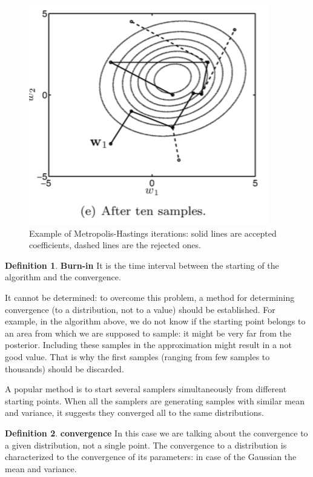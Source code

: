 \documentclass[12pt, letterpaper]{article}
\theoremstyle{definition}
\newtheorem{definition}{Definition}[section]
\begin{document}
\begin{figure}
\centering
\includegraphics[scale=0.4]{img/randomWalk}
\caption{Example of Metropolis-Hastings iterations: solid lines are accepted coefficients, dashed lines are the rejected ones.}
\label{randomWalk}
\end{figure}

\begin{definition}{\textbf{Burn-in}} It is the time interval between the starting of the algorithm and the convergence. 
\end{definition}
It cannot be determined: to overcome this problem, a method for determining convergence (to a distribution, not to a value) should be established. For example, in the algorithm above, we do not know if the starting point belongs to an area from which we are supposed to sample: it might be very far from the posterior. Including these samples in the approximation might result in a not good value. That is why the first samples (ranging from few samples to thousands) should be discarded.

A popular method is to start several samplers simultaneously from different starting points. When all the samplers are generating samples with similar mean and variance, it suggests they converged all to the same distributions.

\begin{definition}{\textbf{convergence} In this case we are talking about the convergence to a given distribution, not a single point. The convergence to a distribution is characterized to the convergence of its parameters: in case of the Gaussian the mean and variance.}
\end{definition}
\end{document}
